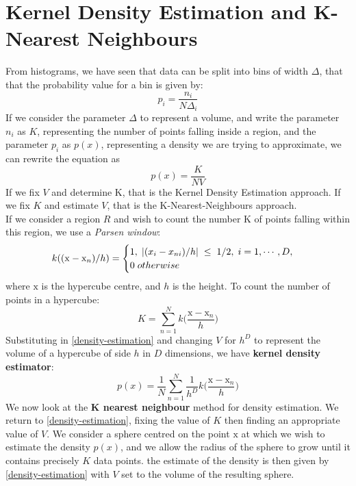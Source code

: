 \section{Kernel Density Estimation and K-Nearest Neighbours}
From histograms, we have seen that data can be split into bins of width $\Delta$, that that the probability value for a bin is given by:
$$
    p_i=\frac{n_i}{N\Delta_i}
$$
If we consider the parameter $\Delta$ to represent a volume, and write the parameter $n_i$ as $K$, representing the number of points falling inside a region, and the parameter $p_i$ as $p(x)$, representing a density we are trying to approximate, we can rewrite the equation as
\begin{equation}
    p(x)=\frac{K}{NV} \label{density-estimation}
\end{equation}
If we fix $V$ and determine K, that is the Kernel Density Estimation approach. If we fix $K$ and estimate $V$, that is the K-Nearest-Neighbours approach.\\
If we consider a region $R$ and wish to count the number K of points falling within this region, we use a \textit{Parsen window}:
$$
  k((\mathrm{x}-\mathrm{x}_n)/h) = \begin{cases}
               1,\hspace{1mm}|(x_i-x_{ni})/h|\hspace{1mm} \leq\hspace{1mm} 1/2, \hspace{1mm}i = 1,\cdots, D, \\
               0\hspace{1mm}otherwise
            \end{cases}
$$
where $\mathrm{x}$ is the hypercube centre, and $h$ is the height. To count the number of points in a hypercube:
\begin{equation}
K = \sum_{n=1}^Nk\bigg(\frac{\mathrm{x}-\mathrm{x}_n}{h}\bigg)
\end{equation}
Substituting in \ref{density-estimation} and changing $V$ for $h^D$ to represent the volume of a hypercube of side $h$ in $D$ dimensions, we have \textbf{kernel density estimator}:
\begin{equation}
    p(x) = \frac{1}{N}\sum_{n=1}^N \frac{1}{h^D} k\bigg(\frac{\mathrm{x}-\mathrm{x}_n}{h}\bigg)
\end{equation}
We now look at the \textbf{K nearest neighbour} method for density estimation. We return to \ref{density-estimation}, fixing the value of $K$ then finding an appropriate value of $V$. We consider a sphere centred on the point $\mathrm{x}$ at which we wish to estimate the density $p(x)$, and we allow the radius of the sphere to grow until it contains precisely $K$ data points. the estimate of the density is then given by \ref{density-estimation} with $V$ set to the volume of the resulting sphere.\\
